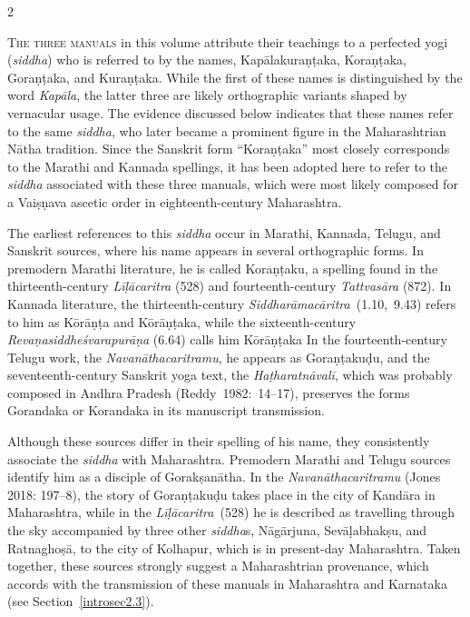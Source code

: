 \begin{nohyp}
\begin{eng}
\label{introsec2}
\end{eng}
\vskip 22pt

\begin{multicols*}{2}
\begin{eng}
\label{introsec2.1}
\vskip 9pt

\lettrine[lines=3,lhang=0.04,nindent=0em]{T}{he three manuals} in this volume attribute their teachings to a perfected yogi (\emph{siddha}) who is referred to by the names, Kapālakuraṇṭaka, Koraṇṭaka, Goraṇṭaka, and Kuraṇṭaka. While the first of these names is distinguished by the word \emph{Kapāla}, the latter three are likely orthographic variants shaped by vernacular usage. The evidence discussed below indicates that these names refer to the same \emph{siddha}, who later became a prominent figure in the Maharashtrian Nātha tradition. Since the Sanskrit form ``Koraṇṭaka'' most closely corresponds to the Marathi and Kannada spellings, it has been adopted here to refer to the \emph{siddha} associated with these three manuals, which were most likely composed for a Vaiṣṇava ascetic order in eighteenth-century Maharashtra.

The earliest references to this \emph{siddha} occur in Marathi, Kannada, Telugu, and Sanskrit sources, where his name appears in several orthographic forms. In premodern Marathi literature, he is called Koraṇṭaku, a spelling found in the thirteenth-century \emph{Līḷācaritra} (528) and fourteenth-century \emph{Tattvasāra} (872). In Kannada literature, the thirteenth-century \emph{Siddharāmacāritra~}(1.10,~9.43) refers to him as Kōrāṇṭa and Kōrāṇṭaka, while the sixteenth-century \emph{Revaṇasiddheśvarapurāṇa} (6.64) calls him Kōrāṇṭaka In the fourteenth-century Telugu work, the \emph{Navanāthacaritramu}, he appears as Goraṇṭakuḍu, and the seventeenth-century Sanskrit yoga text, the \emph{Haṭharatnāvalī}, which was probably composed in Andhra Pradesh (Reddy~1982:~14--17), preserves the forms Gorandaka or Korandaka in its manuscript transmission.

Although these sources differ in their spelling of his name, they consistently associate the \emph{siddha} with Maharashtra. Premodern Marathi and Telugu sources identify him as a disciple of Gorakṣanātha. In the \emph{Navanāthacaritramu} (Jones 2018: 197--8), the story of Goraṇṭakuḍu takes place in the city of Kandāra in Maharashtra, while in the \emph{Līḷācaritra~}(528) he is described as travelling through the sky accompanied by three other \emph{siddha}s, Nāgārjuna, Sevāḷabhakṣu, and Ratnaghoṣā, to the city of Kolhapur, which is in present-day Maharashtra. Taken together, these sources strongly suggest a Maharashtrian provenance, which accords with the transmission of these manuals in Maharashtra and Karnataka (see Section~\ref{introsec2.3}).


\end{eng}
\end{multicols*}
\end{nohyp}
